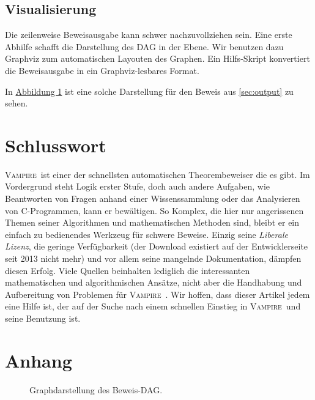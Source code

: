 \documentclass{article}
\newcommand{\vampire}{\textsc{Vampire}~}
\begin{document}
\subsection{Visualisierung}
\label{subsec:outputvis}

Die zeilenweise Beweisausgabe kann schwer nachzuvollziehen sein. Eine erste Abhilfe schafft
die Darstellung des DAG in der Ebene. Wir benutzen dazu Graphviz zum automatischen Layouten
des Graphen. Ein Hilfs-Skript konvertiert die Beweisausgabe in ein Graphviz-lesbares Format.

In \hyperref[fig:pytripleproof]{Abbildung 1} ist eine solche Darstellung für den Beweis aus \ref{sec:output} 
zu sehen.




\section{Schlusswort}
\label{sec:conclusion}
\vampire ist einer der schnellsten automatischen Theorembeweiser die es gibt. Im Vordergrund steht Logik erster Stufe, doch auch andere Aufgaben, wie Beantworten von Fragen anhand einer Wissenssammlung oder das Analysieren von C-Programmen, kann er bewältigen. So Komplex, die hier nur angerissenen Themen seiner Algorithmen und mathematischen Methoden sind, bleibt er ein einfach zu bedienendes Werkzeug für schwere Beweise. Einzig seine \textit{Liberale Lizenz}, die geringe Verfügbarkeit (der Download existiert auf der Entwicklerseite seit 2013 nicht mehr) und vor allem seine mangelnde Dokumentation, dämpfen diesen Erfolg. Viele Quellen beinhalten lediglich die interessanten mathematischen und algorithmischen Ansätze, nicht aber die Handhabung und Aufbereitung von Problemen für \vampire. Wir hoffen, dass dieser Artikel jedem eine Hilfe ist, der auf der Suche nach einem schnellen Einstieg in \vampire und seine Benutzung ist.







\newpage
\section*{Anhang}
\begin{figure}[hbtp]
	\centering
	\caption{Graphdarstellung des Beweis-DAG.}
	\label{fig:pytripleproof}
\end{figure}
\end{document}

